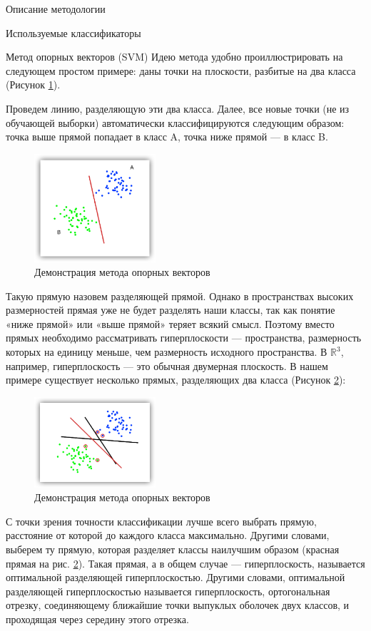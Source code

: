 \begin{section}{Описание методологии}
\begin{subsection}{Используемые классификаторы}
\begin{subsubsection}{Метод опорных векторов (SVM)}
Идею метода удобно проиллюстрировать на следующем простом примере: даны точки на плоскости, разбитые на два класса (Рисунок \ref{pic:SVM1}).

  Проведем линию, разделяющую эти два класса. Далее, все новые точки (не из обучающей выборки) автоматически классифицируются следующим образом:
точка выше прямой попадает в класс A,
точка ниже прямой — в класс B.

\begin{figure}[ht!]
\centering
\includegraphics[width=0.4\textwidth]{pics/SVM1}
\caption{Демонстрация метода опорных векторов}
\label{pic:SVM1}
\end{figure}

Такую прямую назовем разделяющей прямой. Однако в пространствах высоких размерностей прямая уже не будет разделять наши классы, так как понятие «ниже прямой» или «выше прямой» теряет всякий смысл. Поэтому вместо прямых необходимо рассматривать гиперплоскости — пространства, размерность которых на единицу меньше, чем размерность исходного пространства. В $\mathbb{R}^3$, например, гиперплоскость — это обычная двумерная плоскость.
В нашем примере существует несколько прямых, разделяющих два класса (Рисунок \ref{pic:SVM2}):

\begin{figure}[ht!]
\centering
\includegraphics[width=0.4\textwidth]{pics/SVM2}
\caption{Демонстрация метода опорных векторов}
\label{pic:SVM2}
\end{figure}

С точки зрения точности классификации лучше всего выбрать прямую, расстояние от которой до каждого класса максимально. Другими словами, выберем ту прямую, которая разделяет классы наилучшим образом (красная прямая на рис. \ref{pic:SVM2}). Такая прямая, а в общем случае — гиперплоскость, называется оптимальной разделяющей гиперплоскостью.
Другими словами, оптимальной разделяющей гиперплоскостью называется гиперплоскость, ортогональная отрезку, соединяющему ближайшие точки выпуклых оболочек двух классов, и проходящая через середину этого отрезка.


\end{subsubsection}
\end{subsection}
\end{section}

